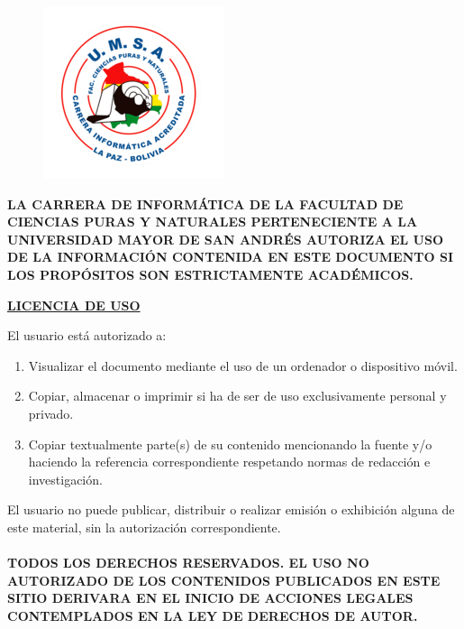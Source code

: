 \begin{figure}[ht]
\begin{minipage}{0.2\textwidth}
    \includegraphics[width=\linewidth]{images/logo-inf.png}
  \end{minipage}
\end{figure}
\noindent \textbf{LA CARRERA DE INFORMÁTICA DE LA FACULTAD DE CIENCIAS PURAS Y NATURALES PERTENECIENTE A LA UNIVERSIDAD MAYOR DE SAN ANDRÉS AUTORIZA EL USO DE LA INFORMACIÓN CONTENIDA EN ESTE DOCUMENTO SI LOS PROPÓSITOS SON ESTRICTAMENTE ACADÉMICOS.} \\
\begin{center}
  \textbf{\underline{LICENCIA DE USO}}
\end{center}
El usuario está autorizado a:
\vspace{-1em}
\begin{enumerate}[label=\alph*), itemsep=-3pt]
  \item Visualizar el documento mediante el uso de un ordenador o dispositivo móvil.
  \item Copiar, almacenar o imprimir si ha de ser de uso exclusivamente personal y privado.
  \item Copiar textualmente parte(s) de su contenido mencionando la fuente y/o haciendo la referencia correspondiente respetando normas de redacción e investigación.
\end{enumerate}
El usuario no puede publicar, distribuir o realizar emisión o exhibición alguna de este material, sin la autorización correspondiente. \\\\
\textbf{TODOS LOS DERECHOS RESERVADOS. EL USO NO AUTORIZADO DE LOS CONTENIDOS PUBLICADOS EN ESTE SITIO DERIVARA EN EL INICIO DE ACCIONES LEGALES CONTEMPLADOS EN LA LEY DE DERECHOS DE AUTOR.}
